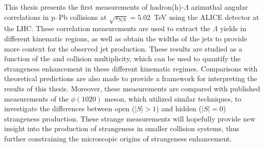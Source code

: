 This thesis presents the first measurements of hadron(h)-$\Lambda$ azimuthal angular correlations in p--Pb collisions at $\sqrt{s_{\mathrm NN}} = 5.02$~TeV using the ALICE detector at the LHC. These correlation measurements are used to extract the $\Lambda$ yields in different kinematic regions, as well as obtain the widths of the jets to provide more context for the observed jet production. These results are studied as a function of the \lmb \pt and collision multiplicity, which can be used to quantify the strangeness enhancement in these different kinematic regimes. Comparisons with theoretical predictions are also made to provide a framework for interpreting the results of this thesis. Moreover, these measurements are compared with published measurements of the $\phi(1020)$ meson, which utilized similar techniques, to investigate the differences between open ($|S| > 1$) and hidden ($|S| = 0$) strangeness production. These strange measurements will hopefully provide new insight into the production of strangeness in smaller collision systems, thus further constraining the microscopic origins of strangeness enhancement.